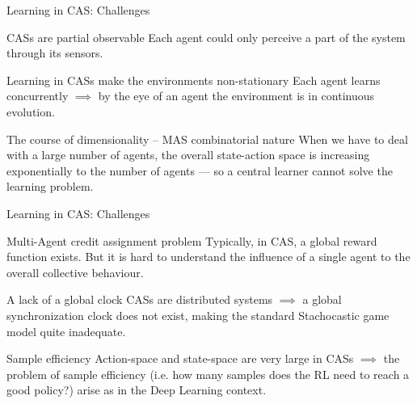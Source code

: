 \documentclass[presentation]{beamer}\mode<presentation>{\usetheme{AMSBolognaFC}}
\begin{document}
\begin{frame}[c]{Learning in CAS: Challenges}
	\begin{exampleblock}{CASs are partial observable}
		Each agent could only perceive a part of the system through its sensors.
	\end{exampleblock}
	\begin{alertblock}{Learning in CASs make the environments non-stationary}
		Each agent learns concurrently $\implies$ by the eye of an agent the environment is in continuous evolution.
	\end{alertblock}
	\begin{alertblock}{The course of dimensionality -- MAS combinatorial nature}
		When we have to deal with a large number of agents, the overall state-action space is increasing exponentially to the number of agents --- so a central learner cannot solve the learning problem.
	\end{alertblock}
\end{frame}
\begin{frame}[c]{Learning in CAS: Challenges}
	\begin{exampleblock}{Multi-Agent credit assignment problem}
		Typically, in CAS, a global reward function exists. But it is hard to understand the influence of a single agent to
		the overall collective behaviour.
	\end{exampleblock}
	\begin{exampleblock}{A lack of a global clock}
		CASs are distributed systems $\implies$ a global synchronization clock does not exist, making the standard
		Stachocastic game model quite inadequate.
	\end{exampleblock}
	\begin{exampleblock}{Sample efficiency}
		Action-space and state-space are very large in CASs $\implies$ the problem of sample efficiency (i.e. how many samples does the RL need to reach a good policy?)
		arise as in the Deep Learning context. 
	\end{exampleblock}
\end{frame}
\end{document}

